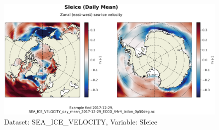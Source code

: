 \begin{figure}[H]
\centering
\includegraphics[scale=0.55]{../images/plots/latlon_plots/Sea-Ice_Velocity/SIeice.png}
\caption{Dataset: SEA\_ICE\_VELOCITY, Variable: SIeice}
\label{tab:table-SEA_ICE_VELOCITY_SIeice-Plot}
\end{figure}
\pagebreak
